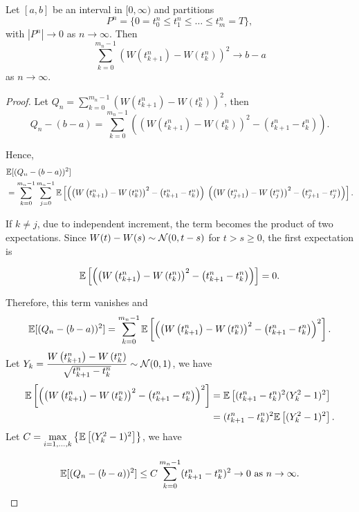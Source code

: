 \begin{theorem}
 \label{theorem:quadratic-variation}
 Let $[a, b]$ be an interval in $[0,\infty)$ and partitions
 $$P^n=\{0=t_0^n\le t_1^n\le\ldots\le t_m^n=T\},$$
 with $\left|P^n\right|\to0$ as $n\to\infty$. Then
 \begin{equation}
  \sum\limits_{k=0}^{m_n-1}\left(W\left(t_{k+1}^n\right)-W\left(t_k^n\right)\right)^2\to b-a
 \end{equation}
 as $n\to\infty$.
\end{theorem}

\begin{proof}
 Let $Q_n=\sum\limits_{k=0}^{m_n-1}\left(W\left(t_{k+1}^n\right)-W\left(t_k^n\right)\right)^2$, then
 $$Q_n-(b-a)=\sum\limits_{k=0}^{m_n-1}\left(\left(W\left(t_{k+1}^n\right)-W\left(t_k^n\right)\right)^2-\left(t^n_{k+1}-t^n_k\right)\right).$$

 Hence,
 \begin{align*}
   & \mathbb{E}[(Q_n-(b-a))^2]                                                                                                                                                                                                                                                                           \\
   & =\sum\limits_{k=0}^{m_n-1}\sum\limits_{j=0}^{m_n-1}\mathbb{E}  \left[\left(\left(W\left(t_{k+1}^n\right)-W\left(t_k^n\right)\right)^2-\left(t^n_{k+1}-t^n_k\right)\right)\right. \left.\left(\left(W\left(t_{j+1}^n\right)-W\left(t_j^n\right)\right)^2-\left(t^n_{j+1}-t^n_j\right)\right)\right].
 \end{align*}

 If $k\ne j$, due to independent increment, the term becomes the product of two expectations. Since $W(t)-W(s)\sim \mathcal{N}(0,t-s)$ for $t>s\ge 0$, the first expectation is

 $$\mathbb{E}\left[\left(\left(W\left(t_{k+1}^n\right)-W\left(t_k^n\right)\right)^2-\left(t^n_{k+1}-t^n_k\right)\right)\right]=0.$$

 Therefore, this term vanishes and
 \begin{align*}
  \mathbb{E}[(Q_n-(b-a))^2]=\sum\limits_{k=0}^{m_n-1}\mathbb{E}\left[\left(\left(W\left(t_{k+1}^n\right)-W\left(t_k^n\right)\right)^2-\left(t^n_{k+1}-t^n_k\right)\right)^2\right].
 \end{align*}
 Let $Y_k = \dfrac{W\left(t_{k+1}^n\right)-W\left(t_k^n\right)}{\sqrt{t_{k+1}^n-t_k^n}}\sim\mathcal{N}(0,1)$, we have
 \begin{align*}
  \mathbb{E}\left[\left(\left(W\left(t_{k+1}^n\right)-W\left(t_k^n\right)\right)^2-\left(t^n_{k+1}-t^n_k\right)\right)^2\right] & =\mathbb{E}\left[(t^n_{k+1}-t^n_k)^2(Y_k^2-1)^2\right]  \\
                                                                                                                         & =(t^n_{k+1}-t^n_k)^2\mathbb{E}\left[(Y_k^2-1)^2\right].
 \end{align*}
 Let $C=\max\limits_{i=1,\ldots,k}\left\{\mathbb{E}\left[(Y_k^2-1)^2\right]\right\}$, we have

 $$\mathbb{E}[(Q_n-(b-a))^2]\le C\sum\limits_{k=0}^{m_n-1}(t^n_{k+1}-t^n_k)^2\to 0 \text{ as } n\to\infty.$$
\end{proof}


